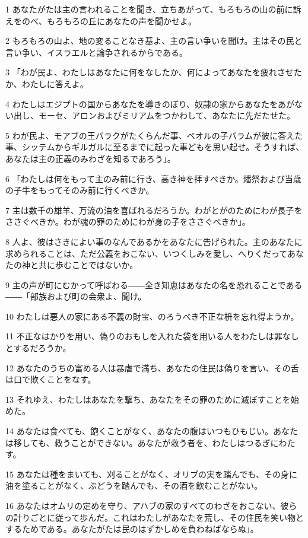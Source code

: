 \par 1 あなたがたは主の言われることを聞き、立ちあがって、もろもろの山の前に訴えをのべ、もろもろの丘にあなたの声を聞かせよ。
\par 2 もろもろの山よ、地の変ることなき基よ、主の言い争いを聞け。主はその民と言い争い、イスラエルと論争されるからである。
\par 3 「わが民よ、わたしはあなたに何をなしたか、何によってあなたを疲れさせたか、わたしに答えよ。
\par 4 わたしはエジプトの国からあなたを導きのぼり、奴隷の家からあなたをあがない出し、モーセ、アロンおよびミリアムをつかわして、あなたに先だたせた。
\par 5 わが民よ、モアブの王バラクがたくらんだ事、ベオルの子バラムが彼に答えた事、シッテムからギルガルに至るまでに起った事どもを思い起せ。そうすれば、あなたは主の正義のみわざを知るであろう」。
\par 6 「わたしは何をもって主のみ前に行き、高き神を拝すべきか。燔祭および当歳の子牛をもってそのみ前に行くべきか。
\par 7 主は数千の雄羊、万流の油を喜ばれるだろうか。わがとがのためにわが長子をささぐべきか。わが魂の罪のためにわが身の子をささぐべきか」。
\par 8 人よ、彼はさきによい事のなんであるかをあなたに告げられた。主のあなたに求められることは、ただ公義をおこない、いつくしみを愛し、へりくだってあなたの神と共に歩むことではないか。
\par 9 主の声が町にむかって呼ばわる――全き知恵はあなたの名を恐れることである――「部族および町の会衆よ、聞け。
\par 10 わたしは悪人の家にある不義の財宝、のろうべき不正な枡を忘れ得ようか。
\par 11 不正なはかりを用い、偽りのおもしを入れた袋を用いる人をわたしは罪なしとするだろうか。
\par 12 あなたのうちの富める人は暴虐で満ち、あなたの住民は偽りを言い、その舌は口で欺くことをなす。
\par 13 それゆえ、わたしはあなたを撃ち、あなたをその罪のために滅ぼすことを始めた。
\par 14 あなたは食べても、飽くことがなく、あなたの腹はいつもひもじい。あなたは移しても、救うことができない。あなたが救う者を、わたしはつるぎにわたす。
\par 15 あなたは種をまいても、刈ることがなく、オリブの実を踏んでも、その身に油を塗ることがなく、ぶどうを踏んでも、その酒を飲むことがない。
\par 16 あなたはオムリの定めを守り、アハブの家のすべてのわざをおこない、彼らの計りごとに従って歩んだ。これはわたしがあなたを荒し、その住民を笑い物とするためである。あなたがたは民のはずかしめを負わねばならぬ」。

